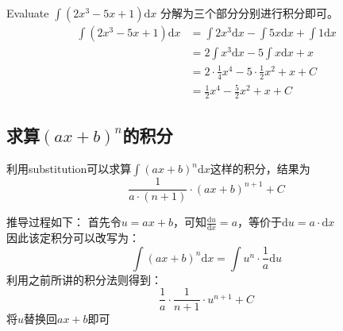 \begin{ExampleBox}
Evaluate $\int (2x^3-5x+1) \mathrm{d} x$
\tcblower
分解为三个部分分别进行积分即可。\\
\begin{align*}
\int (2x^3-5x+1) \mathrm{d} x &= \int 2x^3 \mathrm{d} x -\int 5x \mathrm{d} x+\int 1 \mathrm{d} x\\
					&= 2\int x^3\mathrm{d} x -5 \int x\mathrm{d} x +x\\
					&=2\cdot \frac{1}{4}x^4-5\cdot\frac{1}{2}x^2+x+C\\
					&=\frac{1}{2}x^4-\frac{5}{2}x^2+x+C
\end{align*}

\end{ExampleBox}

\subsection*{求算$(ax+b)^n$的积分}
利用\gls{substitution}可以求算$\int (ax+b)^n \mathrm{d} x$这样的积分，结果为
\[\frac{1}{a\cdot (n+1)}\cdot (ax+b)^{n+1}+C\]

\begin{SummBox}
推导过程如下：
首先令$u=ax+b$，可知$\frac{\mathrm{d} u}{\mathrm{d} x}=a$，等价于$\mathrm{d} u= a\cdot \mathrm{d} x$\\
因此该定积分可以改写为：
\[
	\int (ax+b)^n \mathrm{d} x =\int u^n \cdot \frac{1}{a} \mathrm{d} u
\]
利用之前所讲的积分法则得到：
\[
	\frac{1}{a} \cdot \frac{1}{n+1}\cdot u^{n+1}+C
\]
将$u$替换回$ax+b$即可
\end{SummBox}

